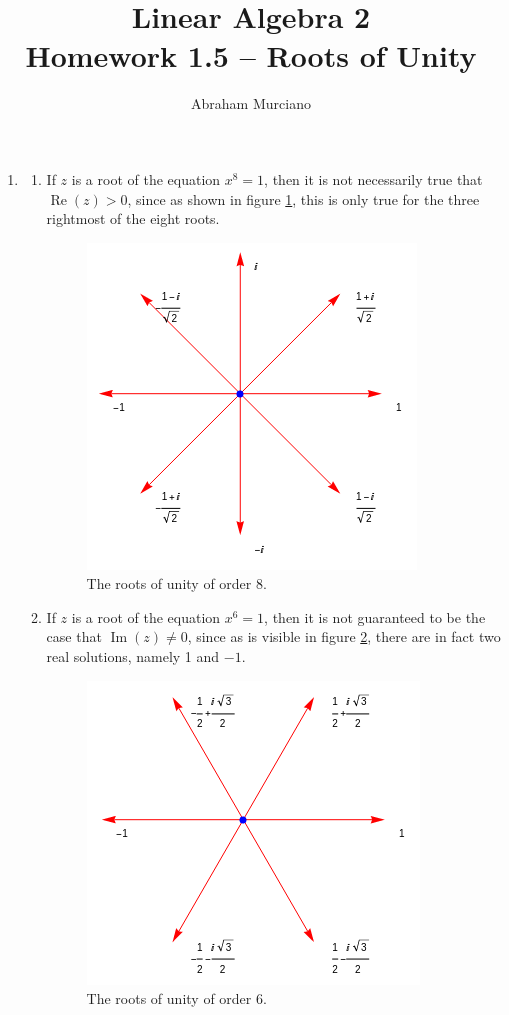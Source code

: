 \documentclass[fleqn]{article}
\title{Linear Algebra 2 \\
\medskip
\large Homework 1.5 -- Roots of Unity}
\author{Abraham Murciano}
\newenvironment{answers}{ %
	\begin{enumerate}
		\setlength{\itemsep}{\bigskipamount}
}{\end{enumerate}}
\begin{document}
\maketitle

\begin{answers}

	\item
		\begin{enumerate}
			\item
				If \(z\) is a root of the equation \(x^8 = 1\), then it is not necessarily true that \(\operatorname{Re}(z) > 0\), since as shown in figure \ref{roots-of-unity-8}, this is only true for the three rightmost of the eight roots.
				\begin{figure}[htbp]
					\centering
					\includegraphics{roots-of-unity-8.png}
					\caption{The roots of unity of order 8.}
					\label{roots-of-unity-8}
				\end{figure}

			\item
				If \(z\) is a root of the equation \(x^6 = 1\), then it is not guaranteed to be the case that \(\operatorname{Im}(z) \neq 0\), since as is visible in figure \ref{roots-of-unity-6}, there are in fact two real solutions, namely 1 and \(-1\).
				\begin{figure}[htbp]
					\centering
					\includegraphics{roots-of-unity-6.png}
					\caption{The roots of unity of order 6.}
					\label{roots-of-unity-6}
				\end{figure}


\end{enumerate}
\end{answers}
\end{document}
